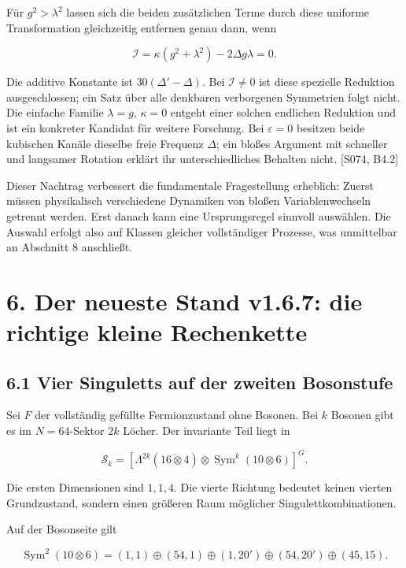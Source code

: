 Für \(g^2>\lambda^2\) lassen sich die beiden zusätzlichen Terme durch
diese uniforme Transformation gleichzeitig entfernen genau dann, wenn

\[\boxed{\mathcal I=\kappa(g^2+\lambda^2)-2\Delta g\lambda=0.}\]

Die additive Konstante ist \(30(\Delta'-\Delta)\). Bei
\(\mathcal I\ne0\) ist diese spezielle Reduktion ausgeschlossen; ein
Satz über alle denkbaren verborgenen Symmetrien folgt nicht. Die
einfache Familie \(\lambda=g\), \(\kappa=0\) entgeht einer solchen
endlichen Reduktion und ist ein konkreter Kandidat für weitere
Forschung. Bei \(\varepsilon=0\) besitzen beide kubischen Kanäle
dieselbe freie Frequenz \(\Delta\); ein bloßes Argument mit schneller
und langsamer Rotation erklärt ihr unterschiedliches Behalten nicht.
{[}S074, B4.2{]}

Dieser Nachtrag verbessert die fundamentale Fragestellung erheblich:
Zuerst müssen physikalisch verschiedene Dynamiken von bloßen
Variablenwechseln getrennt werden. Erst danach kann eine Ursprungsregel
sinnvoll auswählen. Die Auswahl erfolgt also auf Klassen gleicher
vollständiger Prozesse, was unmittelbar an Abschnitt 8 anschließt.

\section{6. Der neueste Stand v1.6.7: die richtige kleine
Rechenkette}\label{der-neueste-stand-v1.6.7-die-richtige-kleine-rechenkette}

\subsection{6.1 Vier Singuletts auf der zweiten
Bosonstufe}\label{vier-singuletts-auf-der-zweiten-bosonstufe}

Sei \(F\) der vollständig gefüllte Fermionzustand ohne Bosonen. Bei
\(k\) Bosonen gibt es im \(N=64\)-Sektor \(2k\) Löcher. Der invariante
Teil liegt in

\[\mathcal S_k=
[\Lambda^{2k}(\overline{16\otimes4})\otimes
\operatorname{Sym}^k(10\otimes6)]^G.\]

Die ersten Dimensionen sind \(1,1,4\). Die vierte Richtung bedeutet
keinen vierten Grundzustand, sondern einen größeren Raum möglicher
Singulettkombinationen.

Auf der Bosonseite gilt

\[\operatorname{Sym}^2(10\otimes6)=
(1,1)\oplus(54,1)\oplus(1,20')\oplus(54,20')\oplus(45,15).\]

